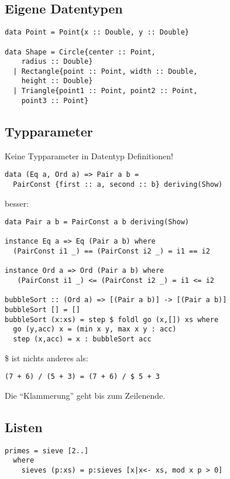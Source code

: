 \documentclass[
  10pt,                   %
  DIV12,
  german,                 %
  oneside,                %
  parskip=half,           %
  headings=normal,        %
  captions=tableheading,  %
]{scrartcl}
\begin{document}
\subsection{Eigene Datentypen}
\begin{lstlisting}
data Point = Point{x :: Double, y :: Double}

data Shape = Circle{center :: Point, 
    radius :: Double}
  | Rectangle{point :: Point, width :: Double, 
    height :: Double}
  | Triangle{point1 :: Point, point2 :: Point, 
    point3 :: Point}
\end{lstlisting}
\subsection{Typparameter}
Keine Typparameter in Datentyp Definitionen!
\begin{lstlisting}
data (Eq a, Ord a) => Pair a b = 
  PairConst {first :: a, second :: b} deriving(Show)
\end{lstlisting}

besser:
\begin{lstlisting}
data Pair a b = PairConst a b deriving(Show)

instance Eq a => Eq (Pair a b) where
  (PairConst i1 _) == (PairConst i2 _) = i1 == i2

instance Ord a => Ord (Pair a b) where
   (PairConst i1 _) <= (PairConst i2 _) = i1 <= i2

bubbleSort :: (Ord a) => [(Pair a b)] -> [(Pair a b)]
bubbleSort [] = []
bubbleSort (x:xs) = step $ foldl go (x,[]) xs where
  go (y,acc) x = (min x y, max x y : acc)
  step (x,acc) = x : bubbleSort acc
\end{lstlisting}

\$ ist nichts anderes als: 
\begin{lstlisting}
(7 + 6) / (5 + 3) = (7 + 6) / $ 5 + 3
\end{lstlisting}
Die "`Klammerung"' geht bis zum Zeilenende.
\subsection{Listen}
\begin{lstlisting}
primes = sieve [2..]
  where
    sieves (p:xs) = p:sieves [x|x<- xs, mod x p > 0]
\end{lstlisting}
\begin{center}
\scalebox{1}{}
\end{center}
\end{document}
